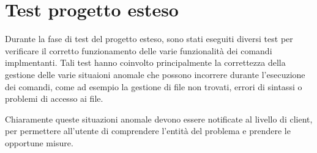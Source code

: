 \section{Test progetto esteso}

Durante la fase di test del progetto esteso, sono stati eseguiti diversi test per verificare il corretto funzionamento delle varie funzionalità dei comandi implmentanti. 
Tali test hanno coinvolto principalmente la correttezza della gestione delle varie situaioni anomale che possono incorrere durante l'esecuzione dei comandi, come ad esempio la gestione di file non trovati, errori di sintassi o problemi di accesso ai file.

Chiaramente queste situazioni anomale devono essere notificate al livello di client, per permettere all'utente di comprendere l'entità del problema e prendere le opportune misure.

\subsection{}